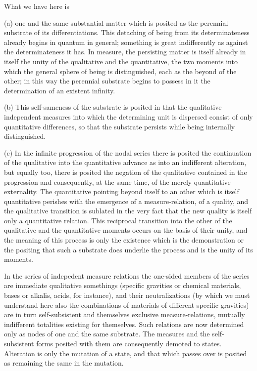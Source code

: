 What we have here is

(a) one and the same substantial matter
which is posited as the perennial substrate
of its differentiations.
This detaching of being from its determinateness
already begins in quantum in general;
something is great indifferently as
against the determinateness it has.
In measure, the persisting matter is
itself already in itself the unity of
the qualitative and the quantitative,
the two moments into which the general
sphere of being is distinguished,
each as the beyond of the other;
in this way the perennial substrate
begins to possess in it the determination
of an existent infinity.

(b) This self-sameness of the substrate is posited
in that the qualitative independent measures
into which the determining unit is dispersed
consist of only quantitative differences,
so that the substrate persists
while being internally distinguished.

(c) In the infinite progression of the nodal series
there is posited the continuation of the qualitative
into the quantitative advance as into an indifferent alteration,
but equally too, there is posited the negation
of the qualitative contained in the progression and consequently,
at the same time, of the merely quantitative externality.
The quantitative pointing beyond itself to an other
which is itself quantitative perishes
with the emergence of a measure-relation,
of a quality, and the qualitative transition is sublated
in the very fact that the new quality is
itself only a quantitative relation.
This reciprocal transition into the other
of the qualitative and the quantitative moments
occurs on the basis of their unity,
and the meaning of this process is only
the existence which is the demonstration or the positing
that such a substrate does underlie the process
and is the unity of its moments.

In the series of indepedent measure relations
the one-sided members of the series are
immediate qualitative somethings
(specific gravities or chemical materials,
bases or alkalis, acids, for instance),
and their neutralizations
(by which we must understand here also the combinations
of materials of different specific gravities)
are in turn self-subsistent
and themselves exclusive measure-relations,
mutually indifferent totalities existing for themselves.
Such relations are now determined
only as nodes of one and the same substrate.
The measures and the self-subsistent forms posited
with them are consequently demoted to states.
Alteration is only the mutation of a state,
and that which passes over is posited
as remaining the same in the mutation.

